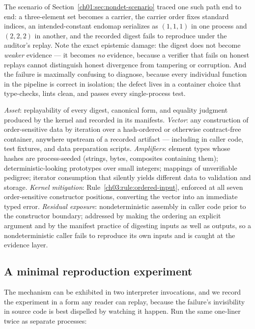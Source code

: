The scenario of Section~\ref{ch01:sec:nondet-scenario} traced one such
path end to end: a three-element set becomes a carrier, the carrier order
fixes standard indices, an intended-constant endomap serializes as
$(1,1,1)$ in one process and $(2,2,2)$ in another, and the recorded digest
fails to reproduce under the auditor's replay. Note the exact epistemic
damage: the digest does not become \emph{weaker} evidence --- it becomes
\emph{no} evidence, because a verifier that fails on honest replays cannot
distinguish honest divergence from tampering or corruption. And the
failure is maximally confusing to diagnose, because every individual
function in the pipeline is correct in isolation; the defect lives in a
container choice that type-checks, lints clean, and passes every
single-process test.

\begin{threat}\label{ch03:threat:hash-order}
\emph{Asset}: replayability of every digest, canonical form, and equality
judgment produced by the kernel and recorded in its manifests.
\emph{Vector}: any construction of order-sensitive data by iteration over
a hash-ordered or otherwise contract-free container, anywhere upstream of
a recorded artifact --- including in caller code, test fixtures, and data
preparation scripts. \emph{Amplifiers}: element types whose hashes are
process-seeded (strings, bytes, composites containing them);
deterministic-looking prototypes over small integers; mappings of
unverifiable pedigree; iterator consumption that silently yields different
data to validation and storage. \emph{Kernel mitigation}:
Rule~\ref{ch03:rule:ordered-input}, enforced at all seven order-sensitive
constructor positions, converting the vector into an immediate typed
error. \emph{Residual exposure}: nondeterministic assembly in caller code
prior to the constructor boundary; addressed by making the ordering an
explicit argument and by the manifest practice of digesting inputs as well
as outputs, so a nondeterministic caller fails to reproduce its own inputs
and is caught at the evidence layer.
\end{threat}

\subsection{A minimal reproduction experiment}

The mechanism can be exhibited in two interpreter invocations, and we
record the experiment in a form any reader can replay, because the
failure's invisibility in source code is best dispelled by watching it
happen. Run the same one-liner twice as separate processes:

